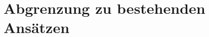 \section{Abgrenzung zu bestehenden Ansätzen}
\label{sec:current-approaches-comparison}

\endinput 

\section{Layout-Patterns}
\label{sec:layout-patterns}




\subsection{Implizite Layout-Patterns}

\subsubsection{Größe der Knoten}
\subsubsection{Zentrierung des Inhalts}
\subsubsection{Gleiche Abstände}
\subsubsection{Verhinderung der Knoten-Überlappung}


